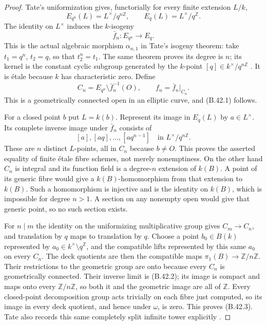\documentclass[11pt,oneside]{article}
\begin{document}
\begin{proof}
Tate's uniformization gives, functorially for
every finite extension $L/k$,
\[
 E_{q^n}(L)=L^\times/q^{n\mathbb Z},
 \qquad E_q(L)=L^\times/q^{\mathbb Z}.
\]
The identity on $L^\times$ induces the
$k$-isogeny
\[
 \bar f_n:E_{q^n}\longrightarrow E_q.
\]
This is the actual algebraic morphism
$\alpha_{n,1}$ in Tate's isogeny theorem:
take $t_1=q^n$, $t_2=q$, so that
$t_2^n=t_1$. The same theorem proves its
degree is $n$; its kernel is the constant
cyclic subgroup generated by the $k$-point
$[q]\in k^\times/q^{n\mathbb Z}$
\cite[Theorem 1 and the isogeny theorem]{B_TateUniformization}.
It is \'etale because $k$ has characteristic
zero. Define
\[
 C_n=E_{q^n}\setminus\bar f_n^{-1}(O),
 \qquad f_n=\bar f_n|_{C_n}.
\]
This is a geometrically connected open in
an elliptic curve, and (B.42.1) follows.

For a closed point $b$ put $L=k(b)$.
Represent its image in $E_q(L)$ by
$a\in L^\times$. Its complete inverse image
under $\bar f_n$ consists of
\[
 [a], [aq],\ldots,[aq^{n-1}]
             \quad\text{in }L^\times/q^{n\mathbb Z}.
\]
These are $n$ distinct $L$-points, all in
$C_n$ because $b\ne O$. This proves the
asserted equality of finite \'etale fibre
schemes, not merely nonemptiness.
On the other hand $C_n$ is integral and its
function field is a degree-$n$ extension
of $k(B)$. A point of its generic fibre would
give a $k(B)$-homomorphism from that extension
to $k(B)$. Such a homomorphism is injective
and is the identity on $k(B)$, which is
impossible for degree $n>1$. A section on
any nonempty open would give that generic
point, so no such section exists.

For $n\mid m$ the identity on the
uniformizing multiplicative group gives
$C_m\to C_n$, and translation by $q$ maps
to translation by $q$. Choose a point
$b_0\in B(k)$ represented by
$a_0\in k^\times\setminus q^{\mathbb Z}$,
and the compatible lifts represented by
this same $a_0$ on every $C_n$.
The deck quotients are then the compatible
maps $\pi_1(B)\to\mathbb Z/n\mathbb Z$.
Their restrictions to the geometric group
are onto because every $C_n$ is
geometrically connected. Their inverse
limit is (B.42.2); its image is compact
and maps onto every $\mathbb Z/n\mathbb Z$,
so both it and the geometric image are
all of $\widehat{\mathbb Z}$.
Every closed-point decomposition group
acts trivially on each fibre just computed,
so its image in every deck quotient,
and hence under $\omega$, is zero.
This proves (B.42.3). Tate also records
this same completely split infinite tower
explicitly \cite[p.~18 of the author manuscript]{B_TateUniformization}.
\end{proof}
\end{document}
